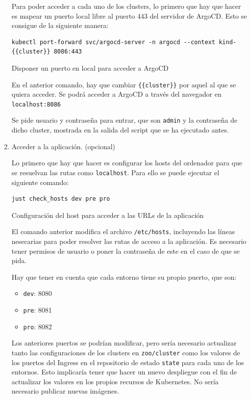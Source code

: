 \begin{enumerate}
    Para poder acceder a cada uno de los clusters, lo primero que hay que hacer es mapear un puerto local libre al puerto 443 del servidor de ArgoCD. Esto se consigue de la siguiente manera:

\begin{listing}[!ht]
  \begin{verbatim}
kubectl port-forward svc/argocd-server -n argocd --context kind-{{cluster}} 8086:443
\end{verbatim}
\caption{Disponer un puerto en local para acceder a ArgoCD}
\end{listing}

    En el anterior comando, hay que cambiar \texttt{\{\{cluster\}\}} por aquel al que se quiera acceder. Se podrá acceder a ArgoCD a través del navegador en \texttt{localhost:8086}

    Se pide usuario y contraseña para entrar, que son \texttt{admin} y la contraseña de dicho cluster, mostrada en la salida del script que se ha ejecutado antes.

  \item Acceder a la aplicación. (opcional)

    Lo primero que hay que hacer es configurar los hosts del ordenador para que se resuelvan las rutas como \texttt{localhost}. Para ello se puede ejecutar el siguiente comando:

\begin{listing}[!ht]
  \begin{verbatim}
just check_hosts dev pre pro
\end{verbatim}
\caption{Configuración del host para acceder a las URLs de la aplicación}
\end{listing}

    El comando anterior modifica el archivo \texttt{/etc/hosts}, incluyendo las líneas nesecarias para poder resolver las rutas de acceso a la aplicación. Es necesario tener permisos de usuario o poner la contraseña de este en el caso de que se pida.

    Hay que tener en cuenta que cada entorno tiene su propio puerto, que son:
    \begin{itemize}
      \item \texttt{dev}: 8080
      \item \texttt{pre}: 8081
      \item \texttt{pro}: 8082
    \end{itemize}

    Los anteriores puertos se podrían modificar, pero sería necesario actualizar tanto las configuraciones de los clusters en \texttt{zoo/cluster} como los valores de los puertos del Ingress en el repositorio de estado \texttt{state} para cada uno de los entornos. Esto implicaría tener que hacer un nuevo despliegue con el fin de actualizar los valores en los propios recursos de Kubernetes. No sería necesario publicar nuevas imágenes.


\end{enumerate}
